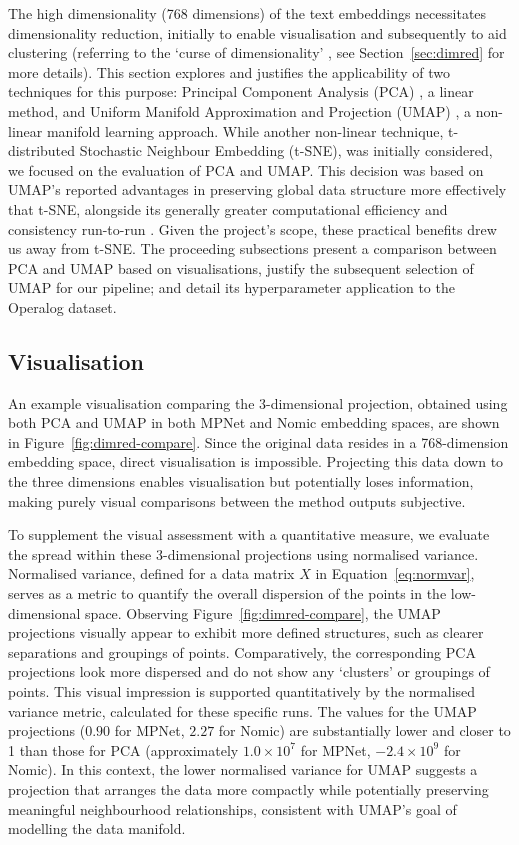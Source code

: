 \documentclass[10pt,oneside]{report}
\begin{document}
The high dimensionality (768 dimensions) of the text embeddings necessitates dimensionality reduction, initially to enable visualisation and subsequently to aid clustering (referring to the `curse of dimensionality' \cite{verleysen2005curse}, see Section~\ref{sec:dimred} for more details). This section explores and justifies the applicability of two techniques for this purpose: Principal Component Analysis (PCA) \cite{pearson1901liii, hotelling1933analysis}, a linear method, and Uniform Manifold Approximation and Projection (UMAP) \cite{mcinnes2018umap}, a non-linear manifold learning approach. While another non-linear technique, t-distributed Stochastic Neighbour Embedding (t-SNE), was initially considered, we focused on the evaluation of PCA and UMAP. This decision was based on UMAP's reported advantages in preserving global data structure more effectively that t-SNE, alongside its generally greater computational efficiency and consistency run-to-run \cite{mcinnes2018umap}. Given the project's scope, these practical benefits drew us away from t-SNE. The proceeding subsections present a comparison between PCA and UMAP based on visualisations, justify the subsequent selection of UMAP for our pipeline; and detail its hyperparameter application to the Operalog dataset.

\subsection{Visualisation}

An example visualisation comparing the 3-dimensional projection, obtained using both PCA and UMAP in both MPNet and Nomic embedding spaces, are shown in Figure~\ref{fig:dimred-compare}. Since the original data resides in a 768-dimension embedding space, direct visualisation is impossible. Projecting this data down to the three dimensions enables visualisation but potentially loses information, making purely visual comparisons between the method outputs subjective.

To supplement the visual assessment with a quantitative measure, we evaluate the spread within these 3-dimensional projections using normalised variance. Normalised variance, defined for a data matrix $X$ in Equation~\ref{eq:normvar}, serves as a metric to quantify the overall dispersion of the points in the low-dimensional space.
Observing Figure~\ref{fig:dimred-compare}, the UMAP projections visually appear to exhibit more defined structures, such as clearer separations and groupings of points. Comparatively, the corresponding PCA projections look more dispersed and do not show any `clusters' or groupings of points. This visual impression is supported quantitatively by the normalised variance metric, calculated for these specific runs. The values for the UMAP projections ($0.90$ for MPNet, $2.27$ for Nomic) are substantially lower and closer to 1 than those for PCA (approximately $1.0 \times 10^7$ for MPNet, $-2.4 \times 10^9$ for Nomic). In this context, the lower normalised variance for UMAP suggests a projection that arranges the data more compactly while potentially preserving meaningful neighbourhood relationships, consistent with UMAP's goal of modelling the data manifold.
\end{document}
